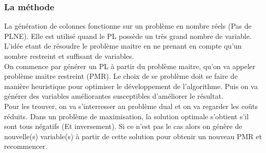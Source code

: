 \subsubsection{La méthode}
La génération de colonnes fonctionne sur un problème en nombre réels (Pas de PLNE). Elle est utilisé quand le PL possède un très grand nombre de variable. L'idée etant de résoudre le problème maitre en ne prenant en compte qu'un nombre restreint et suffisant de variables.\\

On commence par générer un PL à partir du problème maitre, qu'on va appeler problème maitre restreint (PMR). Le choix de se problème doit se faire de manière heuristique pour optimiser le développement de l'algorithme. Puis on va générer des variables améliorantes susceptibles d'améliorer le résultat.\\

Pour les trouver, on va s'interresser au problème dual et on va regarder les coûts réduits. Dans un problème de maximisation, la solution optimale s'obtient s'il sont tous négatifs (Et inversement). Si ce n'est pas le cas alors on génère de nouvelle(s) variable(s) à partir de cette solution pour obtenir un nouveau PMR et recommencer.
